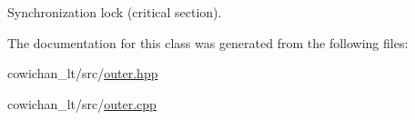 Synchronization lock (critical section). 

The documentation for this class was generated from the following files:\begin{CompactItemize}
\item 
cowichan\_\-lt/src/\hyperlink{outer_8hpp}{outer.hpp}\item 
cowichan\_\-lt/src/\hyperlink{cowichan__lt_2src_2outer_8cpp}{outer.cpp}\end{CompactItemize}
